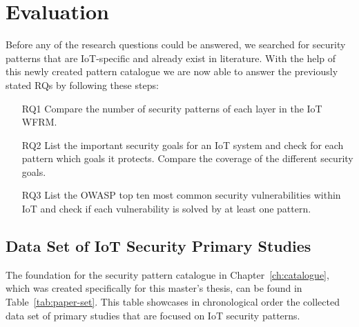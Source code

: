 
\chapter{Evaluation}\label{ch:evaluation}
Before any of the research questions could be answered, we searched for security patterns that are IoT-specific and already exist in literature. With the help of this newly created pattern catalogue we are now able to answer the previously stated RQs by following these steps:

\begin{enumerate}
	\item[RQ1] Compare the number of security patterns of each layer in the IoT WFRM.
	\item[RQ2] List the important security goals for an IoT system and check for each pattern which goals it protects. Compare the coverage of the different security goals.
	\item[RQ3] List the OWASP top ten most common security vulnerabilities within IoT and check if each vulnerability is solved by at least one pattern.
\end{enumerate}
	
	
\section{Data Set of IoT Security Primary Studies}\label{sec:patterns}
The foundation for the security pattern catalogue in Chapter~\ref{ch:catalogue}, which was created specifically for this master's thesis, can be found in Table~\ref{tab:paper-set}. This table showcases in chronological order the collected data set of primary studies that are focused on IoT security patterns.

